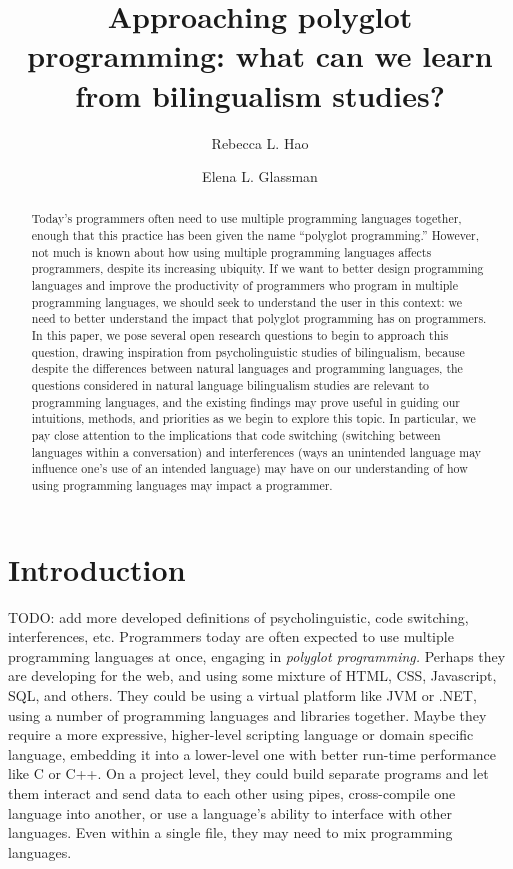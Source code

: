\documentclass[a4paper,UKenglish,cleveref, autoref]{oasics-v2019}
\title{Approaching polyglot programming: what can we learn from bilingualism studies?}
\author{Rebecca L. Hao}{Department of Computer Science and Department of Linguistics, Harvard University, USA}{rhao@college.harvard.edu}{https://orcid.org/0000-0002-1310-2327}{}%
\author{Elena L. Glassman}{Department of Computer Science, Harvard University, USA}{glassman@seas.harvard.edu}{https://orcid.org/0000-0001-5178-3496}{}
\begin{document}
\maketitle

\begin{abstract}
Today's programmers often need to use multiple programming languages together, enough that this practice has been given the name ``polyglot programming.'' However, not much is known about how using multiple programming languages affects programmers, despite its increasing ubiquity. If we want to better design programming languages and improve the productivity of programmers who program in multiple programming languages, we should seek to understand the user in this context: we need to better understand the impact that polyglot programming has on programmers. In this paper, we pose several open research questions to begin to approach this question, drawing inspiration from psycholinguistic studies of bilingualism, because despite the differences between natural languages and programming languages, the questions considered in natural language bilingualism studies are relevant to programming languages, and the existing findings may prove useful in guiding our intuitions, methods, and priorities as we begin to explore this topic. In particular, we pay close attention to the implications that code switching (switching between languages within a conversation) and interferences (ways an unintended language may influence one's use of an intended language) may have on our understanding of how using programming languages may impact a programmer. 
\end{abstract}

\section{Introduction}
\label{sec:typesetting-summary}

TODO: add more developed definitions of psycholinguistic, code switching, interferences, etc. 
Programmers today are often expected to use multiple programming languages at once, engaging in \textit{polyglot programming.} Perhaps they are developing for the web, and using some mixture of HTML, CSS, Javascript, SQL, and others. They could be using a virtual platform like JVM or .NET, using a number of programming languages and libraries together. Maybe they require a more expressive, higher-level scripting language or domain specific language, embedding it into a lower-level one with better run-time performance like C or C++. On a project level, they could build separate programs and let them interact and send data to each other using pipes, cross-compile one language into another, or use a language’s ability to interface with other languages. Even within a single file, they may need to mix programming languages. 
\end{document}
